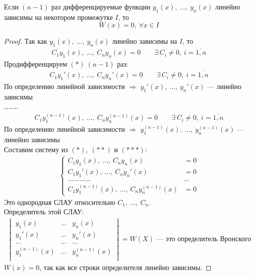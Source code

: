 \begin{theorem}
    Если $(n-1)$ раз дифференцируемые функции $y_1(x),\ \ldots,\ y_n(x)$ линейно зависимы на некотором промежутке $I$, то
    \[
        W(x) = 0,\ \forall x \in I
    \]
\end{theorem}
\begin{proof}
    Так как $y_1(x),\ \ldots,\ y_n(x)$ линейно зависимы на $I$, то
    \begin{gather*}
        \boxed{C_1 y_1(x),\ \ldots,\ C_n y_n(x) = 0}\qquad \exists\, C_i \ne 0,\ i = \overline{1,n} \tag{$*$}
    \end{gather*}
    Продифференцируем $(*)\ (n-1)$ раз:
    \begin{gather*}
        \boxed{C_1 y_1'(x),\ \ldots,\ C_n y_n'(x) = 0}\qquad \exists\, C_i \ne 0,\ i = \overline{1,n} \tag{$**$}
    \end{gather*}
    По определению линейной зависимости $\Rightarrow$ $y_1'(x),\ \ldots,\ y_n'(x)$ --- линейно зависимы \\
    \ldots\ldots\ldots \\
    \begin{gather*}
        \boxed{C_1 y_1^{(n-1)}(x),\ \ldots,\ C_n y_n^{(n-1)}(x) = 0}\qquad \exists\, C_i \ne 0,\ i = \overline{1,n} \tag{$***$}
    \end{gather*}    
    По определению линейной зависимости $\Rightarrow$ $y_1^{(n-1)}(x),\ \ldots,\ y_n^{(n-1)}(x)$ --- линейно зависимы \\
    Составим систему из $(*),\ (**)$ и $(***)$:
    \begin{gather*}
        \left\{ \begin{aligned}
            C_1 y_1(x),\ \ldots,\ C_n y_n(x) &= 0 \\
            C_1 y_1'(x),\ \ldots,\ C_n y_n'(x) &= 0 \\
            \ldots\ldots\ldots\ldots&\ldots \\
            C_1 y_1^{(n-1)}(x),\ \ldots,\ C_n y_n^{(n-1)}(x) &= 0
        \end{aligned} \right.
    \end{gather*}
    Это однородная СЛАУ относительно $C_1,\ \ldots,\ C_n$. \\
    Определитель этой СЛАУ:
    \begin{gather*}
        \begin{vmatrix}
            y_1(x) & \ldots & y_n(x) \\
            y_1'(x) & \ldots & y_n'(x) \\
            \ldots & \ldots & \ldots \\
            y_1^{(n-1)}(x) & \ldots & y_n^{(n-1)}(x) \\
        \end{vmatrix} = W(X) \text{ --- это определитель Вронского}
    \end{gather*}
    $W(x) = 0$, так как все строки определителя линейно зависимы.
\end{proof}

